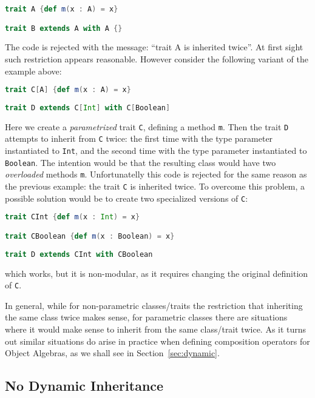 \begin{lstlisting}[language=scala]
trait A {def m(x : A) = x}

trait B extends A with A {}
\end{lstlisting}

\noindent The code is rejected with the message: ``trait A is
inherited twice''. At first sight such restriction appears
reasonable. However consider the following variant of the example 
above:

\begin{lstlisting}[language=scala]
trait C[A] {def m(x : A) = x}
	
trait D extends C[Int] with C[Boolean]
\end{lstlisting}

\noindent Here we create a \emph{parametrized} trait \lstinline{C}, 
defining a method \lstinline{m}. Then the trait \lstinline{D} attempts 
to inherit from \lstinline{C} twice: the first time with the type
parameter instantiated to \lstinline{Int}, and the second time with
the type parameter instantiated to \lstinline{Boolean}. The intention 
would be that the resulting class would have two \emph{overloaded}
methods \lstinline{m}. Unfortunatelly this code is rejected for the
same reason as the previous example: the trait \lstinline{C} is
inherited twice. To overcome this problem, a possible solution would
be to create two specialized versions of \lstinline{C}:

\begin{lstlisting}[language=scala]
trait CInt {def m(x : Int) = x}

trait CBoolean {def m(x : Boolean) = x}
	
trait D extends CInt with CBoolean
\end{lstlisting}

\noindent which works, but it is non-modular, as it requires changing 
the original definition of \lstinline{C}. 

In general, while for non-parametric classes/traits the restriction
that inheriting the same class twice makes sense, for parametric
classes there are situations where it would make sense to inherit 
from the same class/trait twice. As it turns out similar situations 
do arise in practice when defining composition operators for
Object Algebras, as we shall see in Section~\ref{sec:dynamic}.

\subsection{No Dynamic Inheritance}
\label{sec:scala-merge}

